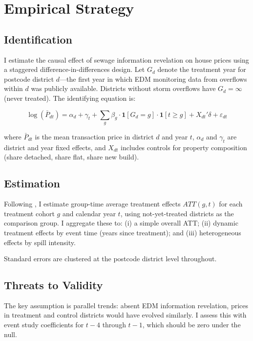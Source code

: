 \documentclass[12pt]{article}
\begin{document}
\section{Empirical Strategy}
\label{sec:strategy}

\subsection{Identification}

I estimate the causal effect of sewage information revelation on house prices using a staggered difference-in-differences design. Let $G_d$ denote the treatment year for postcode district $d$---the first year in which EDM monitoring data from overflows within $d$ was publicly available. Districts without storm overflows have $G_d = \infty$ (never treated). The identifying equation is:

\begin{equation}
\log(\bar{P}_{dt}) = \alpha_d + \gamma_t + \sum_{g} \beta_g \cdot \mathbf{1}[G_d = g] \cdot \mathbf{1}[t \geq g] + X_{dt}'\delta + \varepsilon_{dt}
\label{eq:did}
\end{equation}

where $\bar{P}_{dt}$ is the mean transaction price in district $d$ and year $t$, $\alpha_d$ and $\gamma_t$ are district and year fixed effects, and $X_{dt}$ includes controls for property composition (share detached, share flat, share new build).

\subsection{Estimation}

Following \citet{callaway2021}, I estimate group-time average treatment effects $ATT(g,t)$ for each treatment cohort $g$ and calendar year $t$, using not-yet-treated districts as the comparison group. I aggregate these to: (i) a simple overall ATT; (ii) dynamic treatment effects by event time (years since treatment); and (iii) heterogeneous effects by spill intensity.

Standard errors are clustered at the postcode district level throughout.

\subsection{Threats to Validity}

The key assumption is parallel trends: absent EDM information revelation, prices in treatment and control districts would have evolved similarly. I assess this with event study coefficients for $t-4$ through $t-1$, which should be zero under the null.
\end{document}
